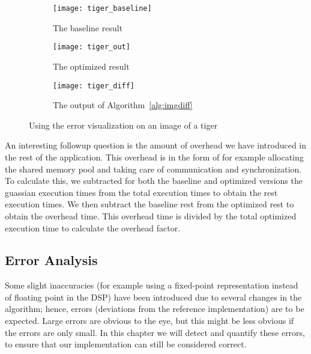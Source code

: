 \begin{figure*}
    \centering
    \begin{subfigure}[b]{0.3\textwidth}
            \texttt{[image: tiger\_baseline]}
            \caption{The baseline result}
            \label{fig:er_tiger_baseline}
    \end{subfigure}
    \begin{subfigure}[b]{0.3\textwidth}
            \texttt{[image: tiger\_out]}
            \caption{The optimized result}
            \label{fig:er_tiger_out}
    \end{subfigure}
    \begin{subfigure}[b]{0.3\textwidth}
            \texttt{[image: tiger\_diff]}
            \caption{The output of Algorithm~\ref{alg:imgdiff}}
            \label{fig:er_tiger_diff}
    \end{subfigure}
    \caption{Using the error visualization on an image of a tiger}
    \label{fig:imgdiff}
\end{figure*}


An interesting followup question is the amount of overhead we have introduced in the rest of the application. This overhead is in the form of for example allocating the shared memory pool and taking care of communication and synchronization. To calculate this, we subtracted for both the baseline and optimized versions the guassian execution times from the total execution times to obtain the rest execution times. We then subtract the baseline rest from the optimized rest to obtain the overhead time. This overhead time is divided by the total optimized execution time to calculate the overhead factor.


\subsection{Error Analysis}
Some slight inaccuracies (for example using a fixed-point representation instead of floating point in the DSP) have been introduced due to several changes in the algorithm; hence, errors (deviations from the reference implementation) are to be expected. 
Large errors are obvious to the eye, but this might be less obvious if the errors are only small. In this chapter we will detect and quantify these errors, to ensure that our implementation can still be considered correct.

